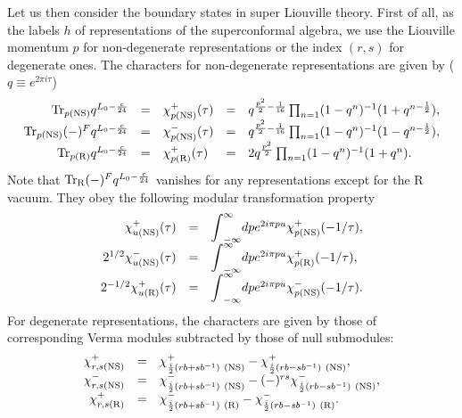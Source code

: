 \documentclass[a4paper,12pt]{article}
\newcommand{\mint}{{\displaystyle\int}}
\newcommand{\NS}{{\rm NS}}
\newcommand{\R}{{\rm R}}
\begin{document}
   Let us then consider the boundary states in super Liouville theory.
 First of all, as the labels $h$ of representations of
 the superconformal algebra, we use the Liouville momentum $p$
 for non-degenerate representations or the index $(r,s)$ for degenerate ones.
 The characters for non-degenerate representations are
 given by ($q\equiv e^{2\pi i\tau}$)
\begin{equation}
\begin{array}{rclcl}
  {\rm Tr}_{p(\NS)}q^{L_0-\frac{c}{24}}
  &=& \chi_{p(\NS)}^+(\tau)
  &=& q^{\frac{p^2}{2}-\frac{1}{16}}
      \prod_{n=1}(1-q^{n})^{-1}(1+q^{n-\frac{1}{2}}), \\
  {\rm Tr}_{p(\NS)}(-)^Fq^{L_0-\frac{c}{24}}
  &=& \chi_{p(\NS)}^-(\tau)
  &=& q^{\frac{p^2}{2}-\frac{1}{16}}
      \prod_{n=1}(1-q^{n})^{-1}(1-q^{n-\frac{1}{2}}), \\
  {\rm Tr}_{p(\R)}q^{L_0-\frac{c}{24}}
  &=& \chi_{p(\R)}^+(\tau)
  &=& 2q^{\frac{p^2}{2}}
      \prod_{n=1}(1-q^{n})^{-1}(1+q^n).
\end{array}
\end{equation}
 Note that ${\rm Tr}_\R(-)^Fq^{L_0-\frac{c}{24}}$ vanishes
 for any representations except for the R vacuum. 
 They obey the following modular transformation property
\begin{equation}
\begin{array}{rcl}
  \chi_{u(\NS)}^+(\tau)
  &=& \mint_{-\infty}^\infty dp e^{2i\pi pu}\chi_{p(\NS)}^+(-1/\tau), \\
  2^{1/2}\chi_{u(\NS)}^-(\tau)
  &=& \mint_{-\infty}^\infty dp e^{2i\pi pu}\chi_{p(\R)}^+(-1/\tau), \\
  2^{-1/2}\chi_{u(\R)}^+(\tau)
  &=& \mint_{-\infty}^\infty dp e^{2i\pi pu}\chi_{p(\NS)}^-(-1/\tau).
\end{array}
\end{equation}
 For degenerate representations, the characters are given by
 those of corresponding Verma modules subtracted by those
 of null submodules:
\begin{equation}
\begin{array}{rclcl}
    \chi_{r,s(\NS)}^+
&=& \chi_{\frac{i}{2}(rb+sb^{-1})~(\NS)}^+
   -\chi_{\frac{i}{2}(rb-sb^{-1})~(\NS)}^+, \\
    \chi_{r,s(\NS)}^-
&=& \chi_{\frac{i}{2}(rb+sb^{-1})~(\NS)}^-
   -(-)^{rs}\chi_{\frac{i}{2}(rb-sb^{-1})~(\NS)}^-, \\
    \chi_{r,s(\R)}^+
&=& \chi_{\frac{i}{2}(rb+sb^{-1})~(\R)}^-
   -\chi_{\frac{i}{2}(rb-sb^{-1})~(\R)}^-.
\end{array}
\end{equation}
\end{document}
